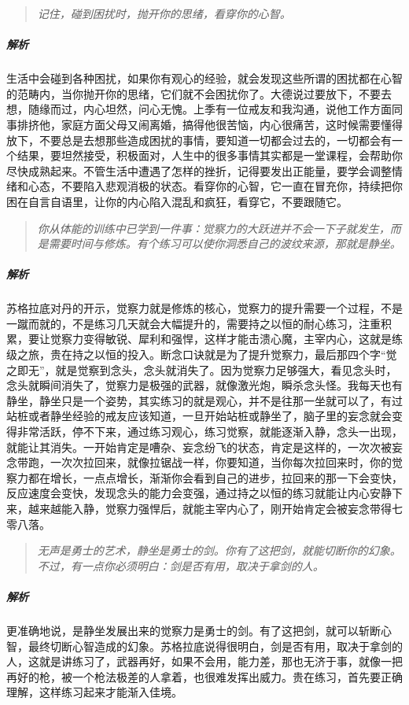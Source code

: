 \begin{quote}\it
    记住，碰到困扰时，抛开你的思绪，看穿你的心智。
\end{quote}

\subparagraph{解析} 生活中会碰到各种困扰，如果你有观心的经验，就会发现这些所谓的困扰都在心智的范畴内，当你抛开你的思绪，它们就不会困扰你了。大德说过要放下，不要去想，随缘而过，内心坦然，问心无愧。上季有一位戒友和我沟通，说他工作方面同事排挤他，家庭方面父母又闹离婚，搞得他很苦恼，内心很痛苦，这时候需要懂得放下，不要总是去想那些造成困扰的事情，要知道一切都会过去的，一切都会有一个结果，要坦然接受，积极面对，人生中的很多事情其实都是一堂课程，会帮助你尽快成熟起来。不管生活中遭遇了怎样的挫折，记得要发出正能量，要学会调整情绪和心态，不要陷入悲观消极的状态。看穿你的心智，它一直在冒充你，持续把你困在自言自语里，让你的内心陷入混乱和疯狂，看穿它，不要跟随它。

\begin{quote}\it
    你从体能的训练中已学到一件事：觉察力的大跃进并不会一下子就发生，而是需要时间与修炼。有个练习可以使你洞悉自己的波纹来源，那就是静坐。
\end{quote}

\subparagraph{解析} 苏格拉底对丹的开示，觉察力就是修炼的核心，觉察力的提升需要一个过程，不是一蹴而就的，不是练习几天就会大幅提升的，需要持之以恒的耐心练习，注重积累，要让觉察力变得敏锐、犀利和强悍，这样才能击溃心魔，主宰内心，这就是练级之旅，贵在持之以恒的投入。断念口诀就是为了提升觉察力，最后那四个字“觉之即无”，就是觉察到念头，念头就消失了。因为觉察力足够强大，看见念头时，念头就瞬间消失了，觉察力是极强的武器，就像激光炮，瞬杀念头怪。我每天也有静坐，静坐只是一个姿势，其实练习的就是观心，并不是往那一坐就可以了，有过站桩或者静坐经验的戒友应该知道，一旦开始站桩或静坐了，脑子里的妄念就会变得非常活跃，停不下来，通过练习观心，练习觉察，就能逐渐入静，念头一出现，就能让其消失。一开始肯定是嘈杂、妄念纷飞的状态，肯定是这样的，一次次被妄念带跑，一次次拉回来，就像拉锯战一样，你要知道，当你每次拉回来时，你的觉察力都在增长，一点点增长，渐渐你会看到自己的进步，拉回来的那一下会变快，反应速度会变快，发现念头的能力会变强，通过持之以恒的练习就能让内心安静下来，越来越能入静，觉察力强悍后，就能主宰内心了，刚开始肯定会被妄念带得七零八落。

\begin{quote}\it
    无声是勇士的艺术，静坐是勇士的剑。你有了这把剑，就能切断你的幻象。不过，有一点你必须明白：剑是否有用，取决于拿剑的人。
\end{quote}

\subparagraph{解析} 更准确地说，是静坐发展出来的觉察力是勇士的剑。有了这把剑，就可以斩断心智，最终切断心智造成的幻象。苏格拉底说得很明白，剑是否有用，取决于拿剑的人，这就是讲练习了，武器再好，如果不会用，能力差，那也无济于事，就像一把再好的枪，被一个枪法极差的人拿着，也很难发挥出威力。贵在练习，首先要正确理解，这样练习起来才能渐入佳境。

